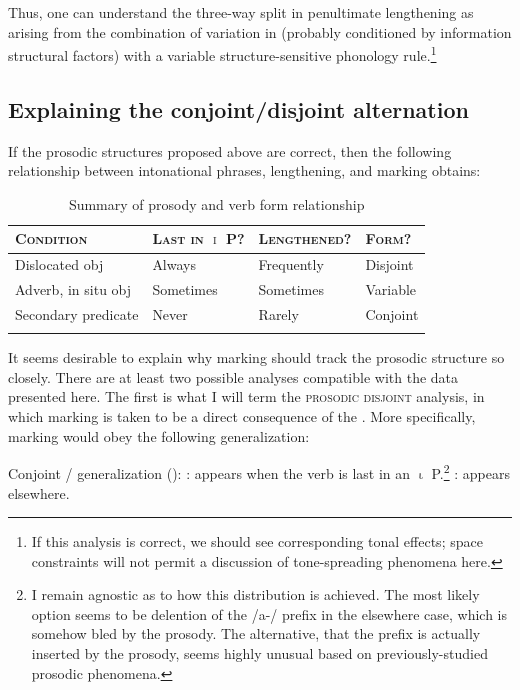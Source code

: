\documentclass[output=paper,modfonts,nonflat,draftmode]{langsci/langscibook}
\begin{document}
Thus, one can understand the three-way split in penultimate lengthening as
arising from the combination of variation in  (probably
conditioned by information structural factors) with a variable
structure-sensitive phonology rule.\footnote{If this analysis is correct, we
should see corresponding tonal effects; space constraints will not permit a
discussion of  tone-spreading phenomena here.}

\subsection{Explaining the conjoint\slash disjoint alternation}

If the prosodic structures proposed above are correct, then the following
relationship between intonational phrases, lengthening, and  marking
obtains:

\begin{table}
	\caption{Summary of prosody and verb form relationship}
	\label{tab:kusmer:summary_ip_disj}
\begin{tabular}{llll}
\lsptoprule
\textsc{Condition} & \textsc{Last in $\upiota$ P?} & \textsc{Lengthened?} &
	\textsc{Form?}\\
	\midrule
{Dislocated obj}       & Always    & Frequently & Disjoint\\
{Adverb, in situ obj} & Sometimes & Sometimes  & Variable\\
{Secondary predicate}     & Never     & Rarely     & Conjoint\\
\lspbottomrule
\end{tabular}
\end{table}

It seems desirable to explain why  marking should track the prosodic
structure so closely. There are at least two possible analyses compatible with
the data presented here. The first is what I will term the \textsc{prosodic
disjoint} analysis, in which  marking is taken to be a direct
consequence of the . More specifically,  
marking would obey the following generalization:


\ea \label{ex:kusmer:venda_gen_fin} {Conjoint /  generalization ():}
	: appears when the verb is last in an $\upiota$
	P.\footnote{I remain agnostic as to how this distribution is achieved. The
	most likely option seems to be delention of the /a-/ prefix in the
	elsewhere case, which is somehow bled by the prosody. The alternative, that
	the prefix is actually inserted by the prosody, seems highly unusual based
	on previously-studied prosodic phenomena.}
	: appears elsewhere.
	\z
\z
\end{document}
